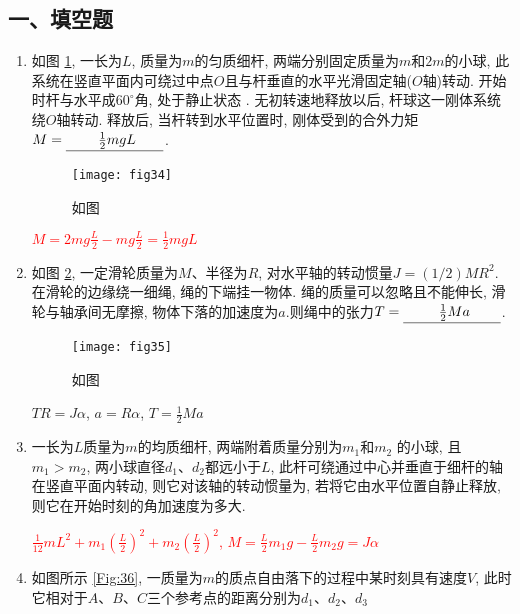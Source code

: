 \subsection*{一、填空题}
\begin{enumerate}
    \item 如图 \ref{Fig:34}, 一长为$L$, 质量为$m$的匀质细杆, 两端分别固定质量为$m$和$2m$的小球,
    此系统在竖直平面内可绕过中点$O$且与杆垂直的水平光滑固定轴($O$轴)转动. 
    开始时杆与水平成$60^\circ$角, 处于静止状态 . 
    无初转速地释放以后, 杆球这一刚体系统绕$O$轴转动. 
    释放后, 当杆转到水平位置时, 刚体受到的合外力矩$M=\anl{$\frac{1}{2}mgL$}$.
    \begin{figure}[h]
        \centering
        \texttt{[image: fig34]}
            \caption{如图}\label{Fig:34}
    \end{figure}
    \begin{note}
        \textcolor{red}{$M=2mg\frac{L}{2}-mg\frac{L}{2}=\frac{1}{2}mgL$}
    \end{note}
    \item 如图 \ref{Fig:35}, 一定滑轮质量为$M$、半径为$R$, 对水平轴的转动惯量$J=(1/2)MR^2$.
    在滑轮的边缘绕一细绳, 绳的下端挂一物体. 
    绳的质量可以忽略且不能伸长, 滑轮与轴承间无摩擦, 
    物体下落的加速度为$a$.则绳中的张力$T=\anl{$\frac{1}{2}Ma$}$.
    \begin{figure}[h]
        \centering
        \texttt{[image: fig35]}
            \caption{如图}\label{Fig:35}
    \end{figure}
    \begin{note}
        $TR=J\alpha$, $a=R\alpha$, $T=\frac{1}{2}Ma$
    \end{note}
    \item 一长为$L$质量为$m$的均质细杆, 两端附着质量分别为$m_1$和$m_2$
    的小球, 且$m_1>m_2$, 两小球直径$d_1$、$d_2$都远小于$L$, 
    此杆可绕通过中心并垂直于细杆的轴在竖直平面内转动, 
    则它对该轴的转动惯量为\underline{}, 若将它由水平位置自静止释放, 
    则它在开始时刻的角加速度为多大\underline{}.
    \begin{note}
        \textcolor{red}{$\frac{1}{12}mL^2+m_1(\frac{L}{2})^2+m_2(\frac{L}{2})^2$, $M=\frac{L}{2}m_1g-\frac{L}{2}m_2g=J\alpha$}
    \end{note}
    \item 如图所示 \ref{Fig:36}, 一质量为$m$的质点自由落下的过程中某时刻具有速度$V$,
    此时它相对于$A$、$B$、$C$三个参考点的距离分别为$d_1、d_2、d_3$

\end{enumerate}
